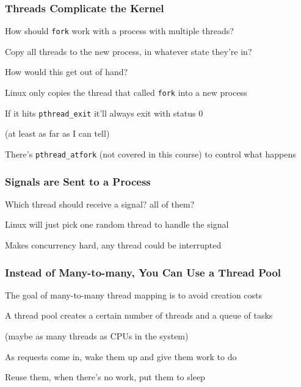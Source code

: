   \begin{frame}
    \frametitle{Threads Complicate the Kernel}

    How should \texttt{fork} work with a process with multiple threads?

    \hspace{2em} Copy all threads to the new process, in whatever state they're
    in?

    \hspace{4em} How would this get out of hand?

    \vspace{2em}

    Linux only copies the thread that called \texttt{fork} into a new process

    \hspace{2em} If it hits \texttt{pthread\_exit} it'll always exit with status
    0

    \hspace{4em} (at least as far as I can tell)

    \vspace{2em}

    There's \texttt{pthread\_atfork} (not covered in this course) to control
    what happens
  \end{frame}

  \begin{frame}
    \frametitle{Signals are Sent to a Process}

    Which thread should receive a signal? all of them?

    \vspace{2em}

    Linux will just pick one random thread to handle the signal

    \hspace{2em} Makes concurrency hard, any thread could be interrupted
  \end{frame}

  \begin{frame}
    \frametitle{Instead of Many-to-many, You Can Use a Thread Pool}

    The goal of many-to-many thread mapping is to avoid creation costs

    \vspace{2em}

    A thread pool creates a certain number of threads and a queue of tasks

    \hspace{2em} (maybe as many threads as CPUs in the system)

    \vspace{2em}

    As requests come in, wake them up and give them work to do

    \vspace{2em}

    Reuse them, when there's no work, put them to sleep
  \end{frame}

